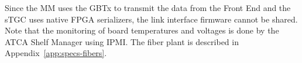 Since the MM uses the GBTx to transmit the data from the Front End and the sTGC uses native FPGA serializers,
the link interface firmware cannot be shared.
Note that the monitoring of board temperatures and voltages is done by the ATCA Shelf Manager using IPMI.
The fiber plant is described in Appendix~\ref{app:specs-fibers}.
